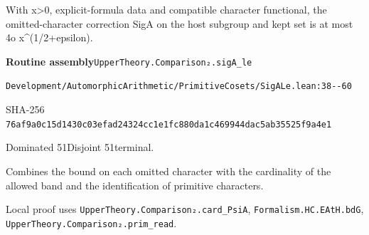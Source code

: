 
\begin{formalstatement}[D549]\label{decomp:D549}
With x>0, explicit-formula data and compatible character functional, the omitted-character correction SigA on the host subgroup and kept set is at most 4o x\textasciicircum{}(1/2+epsilon).
\end{formalstatement}
{\small\raggedright\noindent\textsf{\bfseries Routine assembly}\quad \nolinkurl{UpperTheory.Comparison₂.sigA_le}\par\noindent \nolinkurl{Development/AutomorphicArithmetic/PrimitiveCosets/SigALe.lean:38--60}\par\noindent SHA-256 \nolinkurl{76af9a0c15d1430c03efad24324cc1e1fc880da1c469944dac5ab35525f9a4e1}\par\noindent Dominated 51\quad Disjoint 51\quad terminal.\par}
Combines the bound on each omitted character with the cardinality of the allowed band and the identification of primitive characters.
{\small\raggedright Local proof uses \nolinkurl{UpperTheory.Comparison₂.card_PsiA}, \nolinkurl{Formalism.HC.EAtH.bdG}, \nolinkurl{UpperTheory.Comparison₂.prim_read}.\par}
